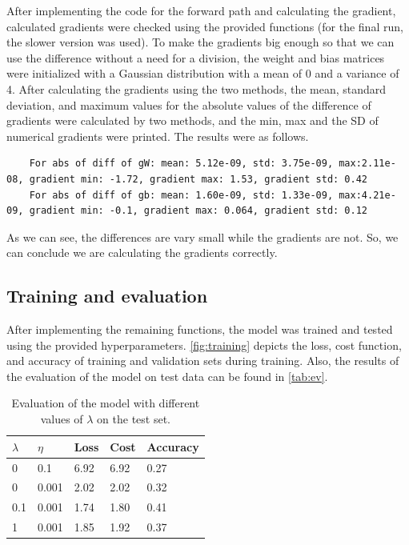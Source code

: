 \documentclass[a4paper]{article}
\begin{document}
After implementing the code for the forward path and calculating the gradient, calculated gradients were checked using the provided functions (for the final run, the slower version was used). To make the gradients big enough so that we can use the difference without a need for a division, the weight and bias matrices were initialized with a Gaussian distribution with a mean of 0 and a variance of 4. After calculating the gradients using the two methods, the mean, standard deviation, and maximum values for the absolute values of the difference of gradients were calculated by two methods, and the min, max and the SD of numerical gradients were printed. The results were as follows.

\begin{lstlisting}
	For abs of diff of gW: mean: 5.12e-09, std: 3.75e-09, max:2.11e-08, gradient min: -1.72, gradient max: 1.53, gradient std: 0.42
	For abs of diff of gb: mean: 1.60e-09, std: 1.33e-09, max:4.21e-09, gradient min: -0.1, gradient max: 0.064, gradient std: 0.12
\end{lstlisting}

As we can see, the differences are vary small while the gradients are not. So, we can conclude we are calculating the gradients correctly.

\subsection{Training and evaluation}

After implementing the remaining functions, the model was trained and tested using the provided hyperparameters. \autoref{fig:training} depicts the loss, cost function, and accuracy of training and validation sets during training. Also, the results of the evaluation of the model on test data can be found in \autoref{tab:ev}.

\begin{table}[h]
	\centering
	\caption{Evaluation of the model with different values of $\lambda$ on the test set.}
	\label{tab:ev}
	\begin{tabular}{|l|l|l|l|l|}
		\hline
		$\lambda$ & $\eta$ & Loss & Cost & Accuracy \\ \hline
		0         & 0.1    & 6.92 & 6.92 & 0.27     \\ \hline
		0         & 0.001  & 2.02 & 2.02 & 0.32     \\ \hline
		0.1       & 0.001  & 1.74 & 1.80 & 0.41     \\ \hline
		1         & 0.001  & 1.85 & 1.92 & 0.37     \\ \hline
	\end{tabular}
\end{table}
\end{document}
